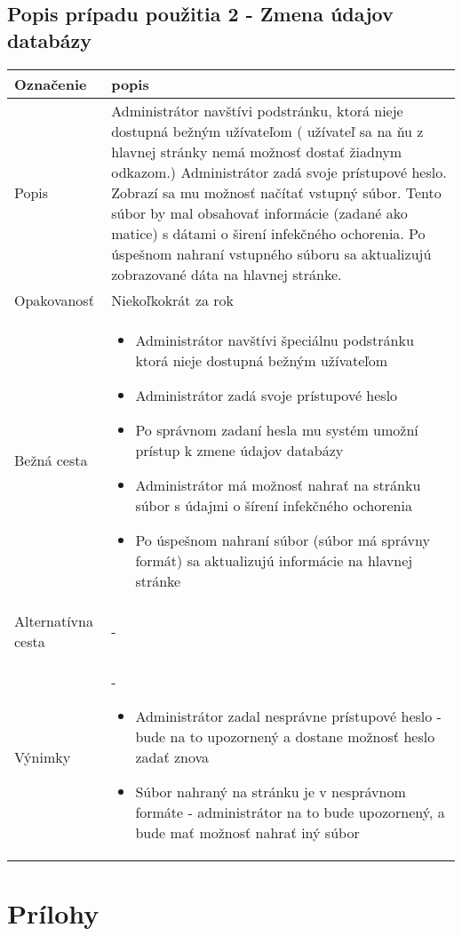 \documentclass[12pt,a4paper]{report}
\begin{document}
\section[Popis prípadu použitia 2 - Zmena údajov databázy]{\rmfamily\bfseries
	Popis prípadu použitia 2 - Zmena údajov databázy}
\begin{table}[h!]
	\centering
	\begin{tabular}{|>{\centering\arraybackslash}m{1in}|>{\centering\arraybackslash}m{1in}|}
		\hline
		\centering Označenie & popis \\ [0ex]
		\hline
		Popis & Administrátor navštívi podstránku, ktorá nieje dostupná bežným užívateľom (
		užívateľ sa na ňu z hlavnej stránky nemá možnosť dostať žiadnym odkazom.) Administrátor
		zadá svoje prístupové heslo. Zobrazí sa mu možnosť načítať vstupný súbor. Tento
		súbor by mal obsahovať informácie (zadané ako matice) s dátami o širení infekčného
		ochorenia. Po úspešnom nahraní vstupného súboru sa aktualizujú zobrazované
		dáta na hlavnej stránke.\\ [0ex]
		\hline
		Opakovanosť & Niekoľkokrát za rok \\ [0ex]
		\hline
		Bežná cesta & 	\begin{itemize}
							\item Administrátor navštívi špeciálnu podstránku ktorá nieje dostupná bežným užívateľom
							\item Administrátor zadá svoje prístupové heslo
							\item Po správnom zadaní hesla mu systém umožní prístup k zmene údajov databázy
							\item Administrátor má možnosť nahrať na stránku súbor s údajmi o šírení infekčného ochorenia
							\item Po úspešnom nahraní súbor (súbor má správny formát) sa aktualizujú informácie na hlavnej stránke
						\end{itemize} \\ [0ex]
		\hline
		Alternatívna cesta & - \\ [0ex]
		\hline
		Výnimky & - \begin{itemize}
						\item Administrátor zadal nesprávne prístupové heslo - bude na to upozornený a dostane možnosť heslo zadať znova
						\item Súbor nahraný na stránku je v nesprávnom formáte - administrátor na to bude upozornený, a bude mať možnosť nahrať iný súbor
					\end{itemize} \\ [0ex]
		\hline
	\end{tabular}
\end{table}

\renewcommand{\chaptername}{}	
\chapter[Prílohy]{\rmfamily\bfseries
	Prílohy}
\end{document}
